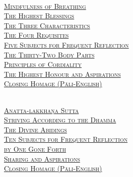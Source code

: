 {  \clearpage

  {\libertinusFont\selectfont\textbf{\textsc{\fontsize{18}{12}\selectfont{}}}}\\

  \textsc{\fontsize{14.4}{28}\selectfont
    \hyperref[mindfulness-of-breathing]{Mindfulness of Breathing} \ifdesktopversion\else\pageref{mindfulness-of-breathing}\fi\\
    \hyperref[highest-blessings]{The Highest Blessings} \ifdesktopversion\else\pageref{highest-blessings}\fi\\
    \hyperref[three-characteristics]{The Three Characteristics} \ifdesktopversion\else\pageref{three-characteristics}\fi\\
    \hyperref[four-requisites]{The Four Requisites} \ifdesktopversion\else\pageref{four-requisites}\fi\\
    \hyperref[five-reflections]{Five Subjects for Frequent Reflection} \ifdesktopversion\else\pageref{five-reflections}\fi\\
    \hyperref[32-parts]{The Thirty-Two Body Parts} \ifdesktopversion\else\pageref{32-parts}\fi\\
    \hyperref[principles-of-cordiality]{Principles of Cordiality} \ifdesktopversion\else\pageref{principles-of-cordiality}\fi\\
    \hyperref[highest-honour-aspirations]{The Highest Honour and Aspirations} \ifdesktopversion\else\pageref{highest-honour-aspirations}\fi\\
    \hyperref[closing-homage]{Closing Homage (Pāli-English)} \ifdesktopversion\else\pageref{closing-homage}\fi\\
  }

  \vspace{1.0cm}

  {\libertinusFont\selectfont\textbf{\textsc{\fontsize{18}{12}\selectfont{}}}}\\

  \textsc{\fontsize{14.4}{28}\selectfont
    \hyperref[anatta-lakkhana]{Anatta-lakkhaṇa Sutta} \ifdesktopversion\else\pageref{anatta-lakkhana}\fi\\
    \hyperref[striving-according-to-dhamma]{Striving According to the Dhamma} \ifdesktopversion\else\pageref{striving-according-to-dhamma}\fi\\
    \hyperref[divine-abidings]{The Divine Abidings} \ifdesktopversion\else\pageref{divine-abidings}\fi\\
    \hyperref[ten-reflections]{Ten Subjects for Frequent Reflection\\ \vspace{-0.4cm} by One Gone Forth} \ifdesktopversion\else\pageref{ten-reflections}\fi\\
    \hyperref[sharing-aspirations]{Sharing and Aspirations} \ifdesktopversion\else\pageref{sharing-aspirations}\fi\\
    \hyperref[closing-homage]{Closing Homage (Pāli-English)} \ifdesktopversion\else\pageref{closing-homage}\fi\\
  }

}
